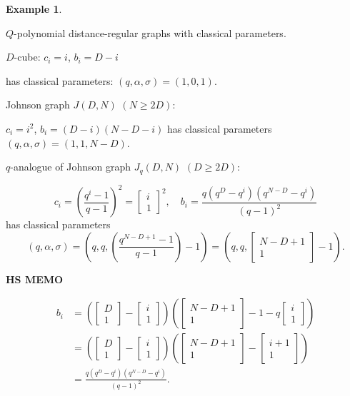 \documentclass[
]{book}
\theoremstyle{definition}
\theoremstyle{definition}
\newtheorem{example}{Example}[chapter]
\theoremstyle{definition}
\theoremstyle{definition}
\theoremstyle{remark}
\begin{document}
\begin{example}
\protect\hypertarget{exm:classical-parameters}{}\label{exm:classical-parameters}

\(Q\)-polynomial distance-regular graphs with classical parameters.

\(D\)-cube: \(c_i = i\), \(b_i = D-i\)

has classical parameters: \((q,\alpha, \sigma) = (1, 0, 1)\).

Johnson graph \(J(D,N)\) \((N\geq 2D)\):

\(c_i = i^2\), \(b_i = (D-i)(N-D-i)\)
has classical parameters \((q,\alpha, \sigma) = (1, 1, N-D)\).

\(q\)-analogue of Johnson graph \(J_q(D,N)\) \((D\geq 2D)\):

\[c_i = \left(\frac{q^i-1}{q-1}\right)^2 = \begin{bmatrix}{i}\\{1}\end{bmatrix}^2, \quad b_i = \frac{q(q^D-q^i)(q^{N-D}-q^i)}{(q-1)^2}\]
has classical parameters
\[(q,\alpha, \sigma) = \left(q, q, \left(\frac{q^{N-D+1}-1}{q-1}\right)-1\right) = \left(q, q, \begin{bmatrix}{N-D+1}\\{1}\end{bmatrix}-1\right).\]

\textbf{HS MEMO}

\begin{align}
b_i & = \left(\begin{bmatrix}{D}\\{1}\end{bmatrix}-\begin{bmatrix}{i}\\{1}\end{bmatrix}\right)\left(\begin{bmatrix}{N-D+1}\\{1}\end{bmatrix}-1-q\begin{bmatrix}{i}\\{1}\end{bmatrix}\right)\\
& = \left(\begin{bmatrix}{D}\\{1}\end{bmatrix}-\begin{bmatrix}{i}\\{1}\end{bmatrix}\right)\left(\begin{bmatrix}{N-D+1}\\{1}\end{bmatrix}-\begin{bmatrix}{i+1}\\{1}\end{bmatrix}\right)\\
& = \frac{q(q^D-q^i)(q^{N-D}-q^i)}{(q-1)^2}.
\end{align}

\end{example}
\end{document}
